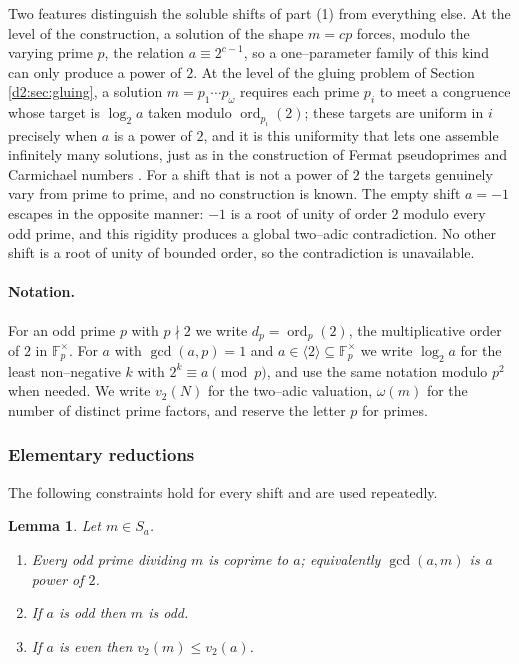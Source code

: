 \documentclass[a4paper]{article}
\theoremstyle{plain}
\newtheorem{lemma}{Lemma}[subsection]
\theoremstyle{definition}
\theoremstyle{remark}
\newcommand{\F}{\mathbb{F}}
\newcommand{\ord}{\operatorname{ord}}
\newcommand{\Sa}{S_a}
\begin{document}
Two features distinguish the soluble shifts of part (1) from everything else. At the level of the construction, a solution of the shape $m=cp$ forces, modulo the varying prime $p$, the relation $a\equiv 2^{c-1}$, so a one--parameter family of this kind can only produce a power of $2$. At the level of the gluing problem of Section \ref{d2:sec:gluing}, a solution $m=p_1\cdots p_\omega$ requires each prime $p_i$ to meet a congruence whose target is $\log_2 a$ taken modulo $\ord_{p_i}(2)$; these targets are uniform in $i$ precisely when $a$ is a power of $2$, and it is this uniformity that lets one assemble infinitely many solutions, just as in the construction of Fermat pseudoprimes and Carmichael numbers \cite{d2:cipolla,d2:agp}. For a shift that is not a power of $2$ the targets genuinely vary from prime to prime, and no construction is known. The empty shift $a=-1$ escapes in the opposite manner: $-1$ is a root of unity of order $2$ modulo every odd prime, and this rigidity produces a global two--adic contradiction. No other shift is a root of unity of bounded order, so the contradiction is unavailable.

\paragraph{Notation.} For an odd prime $p$ with $p\nmid2$ we write $d_p=\ord_p(2)$, the multiplicative order of $2$ in $\F_p^{\times}$. For $a$ with $\gcd(a,p)=1$ and $a\in\langle2\rangle\subseteq\F_p^{\times}$ we write $\log_2a$ for the least non--negative $k$ with $2^{k}\equiv a\pmod p$, and use the same notation modulo $p^{2}$ when needed. We write $v_2(N)$ for the two--adic valuation, $\omega(m)$ for the number of distinct prime factors, and reserve the letter $p$ for primes.

\subsubsection{Elementary reductions}\label{d2:sec:reductions}

The following constraints hold for every shift and are used repeatedly.

\begin{lemma}\label{d2:lem:parity}
Let $m\in\Sa$.
\begin{enumerate}
\item Every odd prime dividing $m$ is coprime to $a$; equivalently $\gcd(a,m)$ is a power of $2$.
\item If $a$ is odd then $m$ is odd.
\item If $a$ is even then $v_2(m)\le v_2(a)$.
\end{enumerate}
\end{lemma}
\end{document}
